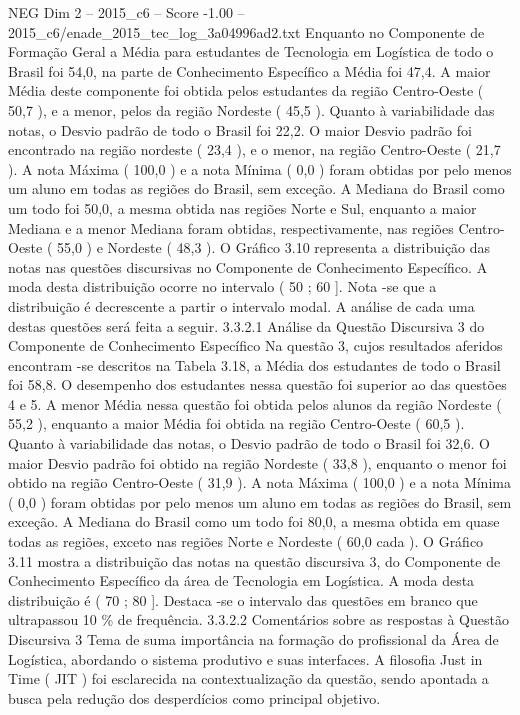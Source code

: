 \begin{textsample}{NEG Dim 2 – 2015\_c6 – Score -1.00 – 2015\_c6/enade\_2015\_tec\_log\_3a04996ad2.txt}
Enquanto no Componente de Formação Geral a Média para estudantes de Tecnologia em Logística de todo o Brasil foi 54,0, na parte de Conhecimento Específico a Média foi 47,4.
A maior Média deste componente foi obtida pelos estudantes da região Centro-Oeste ( 50,7 ), e a menor, pelos da região Nordeste ( 45,5 ).
Quanto à variabilidade das notas, o Desvio padrão de todo o Brasil foi 22,2.
O maior Desvio padrão foi encontrado na região nordeste ( 23,4 ), e o menor, na região Centro-Oeste ( 21,7 ).
A nota Máxima ( 100,0 ) e a nota Mínima ( 0,0 ) foram obtidas por pelo menos um aluno em todas as regiões do Brasil, sem exceção.
A Mediana do Brasil como um todo foi 50,0, a mesma obtida nas regiões Norte e Sul, enquanto a maior Mediana e a menor Mediana foram obtidas, respectivamente, nas regiões Centro-Oeste ( 55,0 ) e Nordeste ( 48,3 ).
O Gráfico 3.10 representa a distribuição das notas nas questões discursivas no Componente de Conhecimento Específico.
A moda desta distribuição ocorre no intervalo ( 50 ; 60 ].
Nota -se que a distribuição é decrescente a partir o intervalo modal.
A análise de cada uma destas questões será feita a seguir. 3.3.2.1 Análise da Questão Discursiva 3 do Componente de Conhecimento Específico Na questão 3, cujos resultados aferidos encontram -se descritos na Tabela 3.18, a Média dos estudantes de todo o Brasil foi 58,8.
O desempenho dos estudantes nessa questão foi superior ao das questões 4 e 5.
A menor Média nessa questão foi obtida pelos alunos da região Nordeste ( 55,2 ), enquanto a maior Média foi obtida na região Centro-Oeste ( 60,5 ).
Quanto à variabilidade das notas, o Desvio padrão de todo o Brasil foi 32,6.
O maior Desvio padrão foi obtido na região Nordeste ( 33,8 ), enquanto o menor foi obtido na região Centro-Oeste ( 31,9 ).
A nota Máxima ( 100,0 ) e a nota Mínima ( 0,0 ) foram obtidas por pelo menos um aluno em todas as regiões do Brasil, sem exceção.
A Mediana do Brasil como um todo foi 80,0, a mesma obtida em quase todas as regiões, exceto nas regiões Norte e Nordeste ( 60,0 cada ).
O Gráfico 3.11 mostra a distribuição das notas na questão discursiva 3, do Componente de Conhecimento Específico da área de Tecnologia em Logística.
A moda desta distribuição é ( 70 ; 80 ].
Destaca -se o intervalo das questões em branco que ultrapassou 10 \% de frequência. 3.3.2.2 Comentários sobre as respostas à Questão Discursiva 3 Tema de suma importância na formação do profissional da Área de Logística, abordando o sistema produtivo e suas interfaces.
A filosofia Just in Time ( JIT ) foi esclarecida na contextualização da questão, sendo apontada a busca pela redução dos desperdícios como principal objetivo.

\end{textsample}
